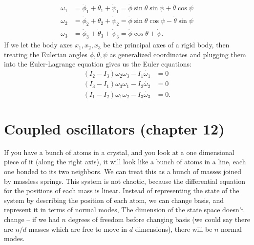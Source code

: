 \documentclass{article}
\begin{document}
\begin{align*}
    \omega_1 &= \dot{\phi}_1 + \dot{\theta}_1 + \dot{\psi}_1 = \dot{\phi} \sin \theta \sin \psi + \dot{\theta} \cos \psi \\
    \omega_2 &= \dot{\phi}_2 + \dot{\theta}_2 + \dot{\psi}_2 = \dot{\phi} \sin \theta \cos \psi - \dot{\theta} \sin \psi \\
    \omega_3 &= \dot{\phi}_3 + \dot{\theta}_3 + \dot{\psi}_3 = \dot{\phi} \cos \theta + \dot{\psi}.
\end{align*}
If we let the body axes $x_1, x_2, x_3$ be the principal axes of a rigid body, then treating the Eulerian angles $\phi, \theta, \psi$ as generalized coordinates and plugging them into the Euler-Lagrange equation gives us the Euler equations:
\begin{align*}
    (I_2-I_3)\omega_2\omega_3 - I_1 \dot{\omega_1} &= 0 \\
    (I_3-I_1)\omega_3\omega_1 - I_2 \dot{\omega_2} &= 0 \\
    (I_1-I_2)\omega_1\omega_2 - I_3 \dot{\omega_3} &= 0.
\end{align*}

\section{Coupled oscillators (chapter 12)}
If you have a bunch of atoms in a crystal, and you look at a one dimensional piece of it (along the right axis), it will look like a bunch of atoms in a line, each one bonded to its two neighbors. We can treat this as a bunch of masses joined by massless springs. This system is not chaotic, because the differential equation for the positions of each mass is linear. Instead of representing the state of the system by describing the position of each atom, we can change basis, and represent it in terms of normal modes, The dimension of the state space doesn't change -- if we had $n$ degrees of freedom before changing basis (we could say there are $n/d$ masses which are free to move in $d$ dimensions), there will be $n$ normal modes.
\end{document}
